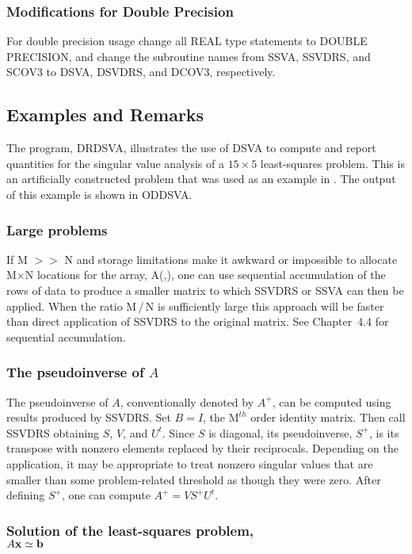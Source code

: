 \documentclass[twoside]{MATH77}
\begin{document}
\subsubsection{Modifications for Double Precision}

For double precision usage change all REAL type statements to DOUBLE
PRECISION, and change the subroutine names from SSVA, SSVDRS, and SCOV3 to
DSVA, DSVDRS, and DCOV3, respectively.

\subsection{Examples and Remarks}

The program, DRDSVA, illustrates the use of DSVA to compute and report
quantities for the singular value analysis of a $15\times 5$ least-squares
problem.  This is an artificially constructed problem that was used as an
example in \cite{Lawson:1974:SLS}.  The output of this example is shown in
ODDSVA.

\subsubsection{Large problems}

If M $>>$ N and storage limitations make it awkward or impossible to
allocate M$\times $N locations for the array, A(,), one can use sequential
accumulation of the rows of data to produce a smaller matrix to which SSVDRS
or SSVA can then be applied. When the ratio M\,/\,N is sufficiently large this
approach will be faster than direct application of SSVDRS to the original
matrix. See Chapter~4.4 for sequential accumulation.

\subsubsection{The pseudoinverse of $A$}

The pseudoinverse of $A$, conventionally denoted by $A^+$, can be computed
using results produced by SSVDRS. Set $B=I$, the $\text{M}^{th}$ order identity
matrix. Then call SSVDRS obtaining $S$, $V$, and $U^t$. Since $S$ is diagonal,
its pseudoinverse, $S^+$, is its transpose with nonzero elements replaced by
their reciprocals. Depending on the application, it may be appropriate to
treat nonzero singular values that are smaller than some problem-related
threshold as though they were zero. After defining $S^+$, one can compute $%
A^+ = VS^+U^t.$

\subsubsection{Solution of the least-squares problem,\protect\\ $A{\bf x}
\simeq {\bf b}$}
\end{document}
